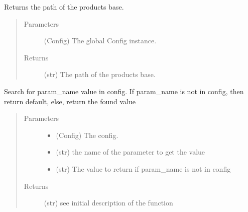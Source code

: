 \documentclass[a4paper,10pt,english]{sphinxmanual}
\begin{document}

\begin{fulllineitems}
\label{\detokenize{apidoc_src/src:src.utilsSat.get_base_path}}
Returns the path of the products base.
\begin{quote}\begin{description}
\item[{Parameters}] \leavevmode
{} \textendash{} (Config) The global Config instance.

\item[{Returns}] \leavevmode
(str) The path of the products base.

\end{description}\end{quote}

\end{fulllineitems}


\begin{fulllineitems}
\label{\detokenize{apidoc_src/src:src.utilsSat.get_cfg_param}}
Search for param\_name value in config.
If param\_name is not in config, then return default,
else, return the found value
\begin{quote}\begin{description}
\item[{Parameters}] \leavevmode\begin{itemize}
\item {} 
 \textendash{} (Config) The config.

\item {} 
 \textendash{} (str) the name of the parameter to get the value

\item {} 
 \textendash{} (str) The value to return if param\_name is not in config

\end{itemize}

\item[{Returns}] \leavevmode
(str) see initial description of the function

\end{description}\end{quote}

\end{fulllineitems}
\end{document}
